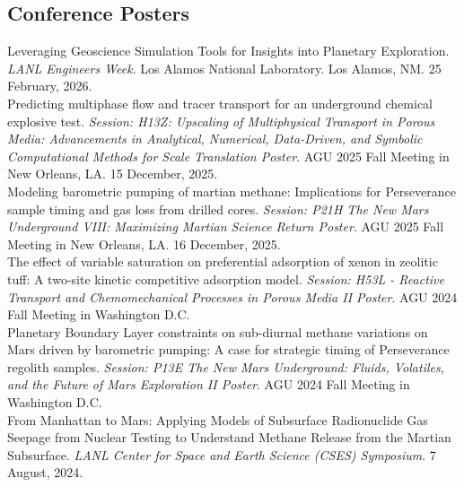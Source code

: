 \documentclass[11pt, letterpaper]{article}
\newcommand{\years}[1]{\marginnote{\scriptsize #1}}
\begin{document}
\subsection*{Conference Posters}
%
\years{2026} Leveraging Geoscience Simulation Tools for Insights into Planetary
Exploration. \textit{LANL Engineers Week}. Los Alamos National Laboratory. Los
Alamos, NM.  25 February, 2026.\\
%
\years{2025} Predicting multiphase flow and tracer transport for an
underground chemical explosive test. \textit{Session: H13Z: Upscaling of
Multiphysical Transport in Porous Media: Advancements in Analytical, Numerical,
Data-Driven, and Symbolic Computational Methods for Scale Translation Poster}.
AGU 2025 Fall Meeting in New Orleans, LA. 15 December, 2025.\\
%
\years{2025} Modeling barometric pumping of martian methane: Implications for
Perseverance sample timing and gas loss from drilled cores. \textit{Session:
P21H The New Mars Underground VIII: Maximizing Martian Science Return Poster}.
AGU 2025 Fall Meeting in New Orleans, LA. 16 December, 2025.\\
%
\years{2024}
The effect of variable saturation on preferential adsorption of xenon in
zeolitic tuff: A two-site kinetic competitive adsorption model. 
\textit{Session: H53L - Reactive Transport and Chemomechanical Processes in
Porous Media II Poster}. AGU 2024 Fall Meeting in Washington D.C.
\AGUFallMeetingAbstraOOOOTheeffectofvariables\\
%
\years{2024}
Planetary Boundary Layer constraints on sub-diurnal methane variations on Mars
driven by barometric pumping: A case for strategic timing of Perseverance
regolith samples.
\textit{Session: P13E The New Mars Underground: Fluids, Volatiles, and the
Future of Mars Exploration II Poster}. AGU 2024 Fall Meeting in Washington
D.C.
\AGUOOOOPlanetaryBoundaryLay\\
%
\years{2024}
From Manhattan to Mars: Applying Models of Subsurface
Radionuclide Gas Seepage from Nuclear Testing to Understand Methane Release
from the Martian Subsurface. \textit{LANL Center for Space and Earth Science (CSES)
Symposium}. 7 August, 2024.\\ 
%
\years{2023}
\end{document}
